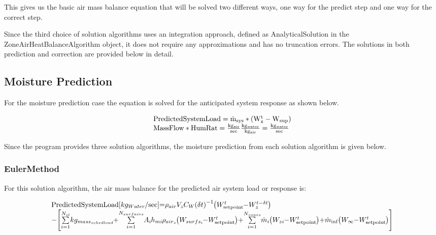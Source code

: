This gives us the basic air mass balance equation that will be solved two different ways, one way for the predict step and one way for the correct step.

Since the third choice of solution algorithms uses an integration approach, defined as AnalyticalSolution in the ZoneAirHeatBalanceAlgorithm object, it does not require any approximations and has no truncation errors. The solutions in both prediction and correction are provided below in detail.

\subsection{Moisture Prediction}\label{moisture-prediction}

For the moisture prediction case the equation is solved for the anticipated system response as shown below.

\begin{equation}
\begin{array}{l}
    \rm{PredictedSystemLoad} = \dot{m}_{sys}*\left(W_z^t - W_{sup}\right) \\
    \rm{MassFlow * HumRat} = \frac{kg_{air}}{sec}\frac{kg_{water}}{kg_{air}} = \frac{kg_{water}}{sec}
  \end{array}
\end{equation}

Since the program provides three solution algorithms, the moisture prediction from each solution algorithm is given below.

\subsubsection{EulerMethod}\label{eulermethod-001}

For this solution algorithm, the air mass balance for the predicted air system load or response is:

{\scriptsize
\begin{equation}
\medmuskip=0mu
\thinmuskip=0mu
\thickmuskip=0mu
\nulldelimiterspace=0pt
\scriptspace=0pt
\begin{array}{l}{\rm{PredictedSystemLoad}}\;[k{g_{Water}}/\sec ] = {\rho_{air}}{V_z}{C_W}{\left( {\delta t} \right)^{ - 1}}\left( {W_{{\rm{setpoint}}}^t - W_z^{t - \delta t}} \right) \\
- \left[ {\sum\limits_{i = 1}^{{N_{sl}}} {k{g_{mas{s_{sched\;load}}}}}  + \sum\limits_{i = 1}^{{N_{surfaces}}} {{A_i}{h_{mi}}} {\rho_{ai{r_z}}}\left( {{W_{surf{s_i}}} - W_{{\rm{setpoint}}}^t} \right) + \sum\limits_{i = 1}^{{N_{zones}}} {{{\dot m}_i}} \left( {{W_{zi}} - W_{{\rm{setpoint}}}^t} \right) + {{\dot m}_{\inf }}\left( {{W_\infty } - W_{{\rm{setpoint}}}^t} \right)} \right]\\\;\;\;\;\;\;\;\;\;\;\;\;\;\;\;\;\;\;\;\;\;\;\;\;\;\;\;\;\;\;\;\;\;\;\;\end{array}
\end{equation}}

